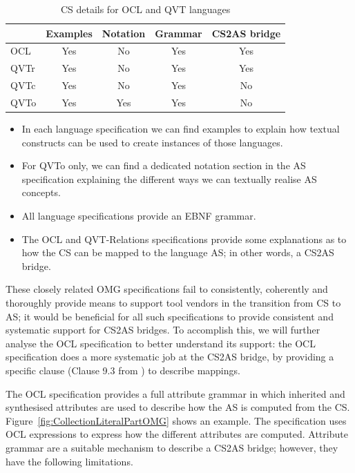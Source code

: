 \documentclass{llncs}
\begin{document}
\begin{table}
\centering
\begin{tabular}{ l | c | c | c | c  }
 & Examples & Notation & Grammar & CS2AS bridge \\
 \hline
OCL & Yes & No & Yes & Yes \\
QVTr & Yes & No & Yes & Yes \\
QVTc & Yes & No & Yes & No \\
QVTo & Yes & Yes & Yes & No \\
\end{tabular}
\caption{CS details for OCL and QVT languages}
\label{tab:OCLQVTcsDetails}
\end{table}

\vspace{-25pt}
\begin{itemize}
\item In each language specification we can find examples to explain how textual constructs can be used to create instances of those languages.
\item For QVTo only, we can find a dedicated notation section in the AS specification explaining the different ways we can textually realise AS concepts.
\item All language specifications provide an EBNF \cite{wirth1996ebnf} grammar.
\item The OCL and QVT-Relations specifications provide some explanations as to how the CS can be mapped to the language AS; in other words, a CS2AS bridge.
\end{itemize}

These closely related OMG specifications fail to consistently, coherently and thoroughly provide means to support tool vendors in the transition from CS to AS; it would be beneficial for all such specifications to provide consistent and systematic support for CS2AS bridges. To accomplish this, we will further analyse the OCL specification to better understand its support: the OCL specification
does a more systematic job at the CS2AS bridge, by providing a specific clause (Clause 9.3 from \cite{omg2013ocl}) to describe mappings.

The OCL specification provides a full attribute grammar in which inherited and synthesised attributes are used to describe how the AS is computed from the CS. Figure~\ref{fig:CollectionLiteralPartOMG} shows an example. The specification uses OCL expressions to express how the different attributes are computed. Attribute grammar are a suitable mechanism to describe a CS2AS bridge; however, they have the following limitations. 
\end{document}
